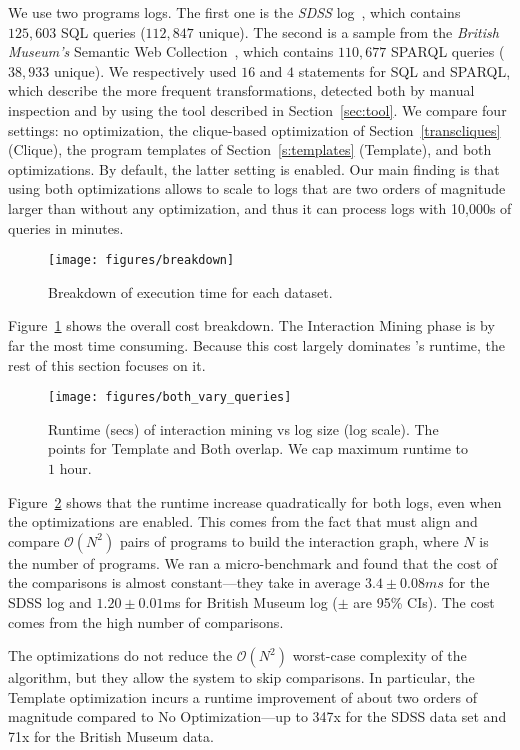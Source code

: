 We use two programs logs. The first one is the {\it SDSS} log~\cite{sdss}, which contains $125,603$ SQL queries ($112,847$ unique).  The second is a sample from the {\it British Museum's} Semantic Web Collection~\cite{britishmuseum}, which contains $110,677$ SPARQL queries ($38,933$ unique). We respectively used $16$ and $4$ \lang statements for SQL and SPARQL, which describe the more frequent transformations, detected both by manual inspection and by using the tool described in Section~\ref{sec:tool}. We compare four settings: no optimization, the clique-based optimization of Section~\ref{transcliques} (Clique), the program templates of Section~\ref{s:templates} (Template), and both optimizations. By default, the latter setting is enabled. Our main finding is that using both optimizations allows \sys to scale to logs that are two orders of magnitude larger than without any optimization, and thus it can process logs with 10,000s of queries in minutes.


\begin{figure}[h!]
    \centering
    \texttt{[image: figures/breakdown]}
    \caption{Breakdown of execution time for each dataset.}
    \label{fig:breakdown}
\end{figure}
 Figure~\ref{fig:breakdown} shows the overall cost breakdown. The Interaction Mining phase is by far the most time consuming. Because this cost largely dominates \sys{}'s runtime, the rest of this section focuses on it.

\begin{figure}[h!]
    \centering
    \texttt{[image: figures/both\_vary\_queries]}
    \caption{Runtime (secs) of interaction mining vs log size (log scale). The points for Template and Both overlap. We cap maximum runtime to $1$ hour.}
    \label{fig:time-both}
\end{figure}
 Figure~\ref{fig:time-both} shows that the runtime increase quadratically for both logs, even when the optimizations are enabled. This comes from the fact that \sys{} must align and compare $\mathcal{O}(N^2)$ pairs of programs to build the interaction graph, where $N$ is the number of programs. We ran a micro-benchmark and found that the cost of the comparisons is almost constant---they take in average $3.4\pm0.08ms$ for the SDSS log and $1.20\pm0.01$ms for British Museum log ($\pm$ are 95\% CIs). The cost comes from the high number of comparisons.

The optimizations do not reduce the $\mathcal{O}(N^2)$ worst-case complexity of the algorithm, but they allow the system to skip comparisons. In particular, the Template optimization incurs a runtime improvement of about two orders of magnitude  compared to No Optimization---up to 347x for the SDSS data set and 71x for the British Museum data.

